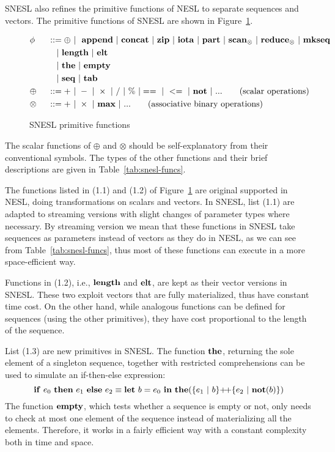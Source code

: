 SNESL also refines the primitive functions of NESL to separate sequences and vectors.
The primitive functions of SNESL are shown in Figure~\ref{fig-snesl-func}.

\begin{figure}[H]\large
\begin{alignat}{2} 
&\phi && ::= \oplus \ | \ \ \mathbf{append} \ | \ \mathbf{concat} \ | \ \mathbf{zip} \ | \ \mathbf{iota}  \ | \ \mathbf{part}  \ | \ \mathbf{scan}_{\otimes} \ | \ \mathbf{reduce}_{\otimes} \ | \ \mathbf{mkseq} \\
&   && \quad | \ \mathbf{length} \ | \ \mathbf{elt} \\
&   && \quad | \ \mathbf{the}  \ | \ \mathbf{empty} \\
&   && \quad | \ \mathbf{seq} \ | \ \mathbf{tab} \\
& \oplus  \ && :: = + \ | \ - \ | \ \times \ |  \  / \ | \ \% \ | ==  \ |\ <=  \ | \ \mathbf{not} \ | \ ... \tag{scalar operations} \\
& \otimes \ && :: = + \ | \ \times  \ | \ \mathbf{max} \ | \ ...  \tag{associative binary operations}
\end{alignat}
\caption{SNESL primitive functions \label{fig-snesl-func}}
\end{figure}

The scalar functions of $\oplus$ and $\otimes$ should be self-explanatory from their conventional symbols. 
The types of the other functions and their brief descriptions are given in Table~\ref{tab:snesl-funcs}.

The functions listed in (1.1) and (1.2) of Figure~\ref{fig-snesl-func} are original supported in NESL, doing transformations on scalars and vectors.
In SNESL, list (1.1) are adapted to streaming versions with slight changes of parameter types where necessary.
By streaming version we mean that these functions in SNESL take sequences as parameters instead of vectors as they do in NESL, as we can see from Table~\ref{tab:snesl-funcs}, thus most of these functions can execute in a more space-efficient way.  

Functions in (1.2), i.e., $\mathbf{length}$ and $\mathbf{elt}$, are kept as their vector versions in SNESL. 
These two exploit vectors that are fully materialized, thus have constant time cost.
On the other hand, while analogous functions can be defined for sequences (using the other primitives), they have cost proportional to the length of the sequence.

List (1.3) are new primitives in SNESL.  
The function $\mathbf{the}$, returning the sole element of a singleton sequence, together with restricted comprehensions can be used to simulate an if-then-else expression:
$$\*{if} \ e_0 \ \*{then} \ e_1 \ \*{else} \ e_2 \equiv \Let{b}{e_0}{ \*{the}(\{e_1 \ | \ b \} {\++} \{e_2 \ | \ \*{not}(b)\})} $$
The function $\mathbf{empty}$, which tests whether a sequence is empty or not, only needs to check at most one element of the sequence instead of materializing all the elements. Therefore, it works in a fairly efficient way with a constant complexity both in time and space.

